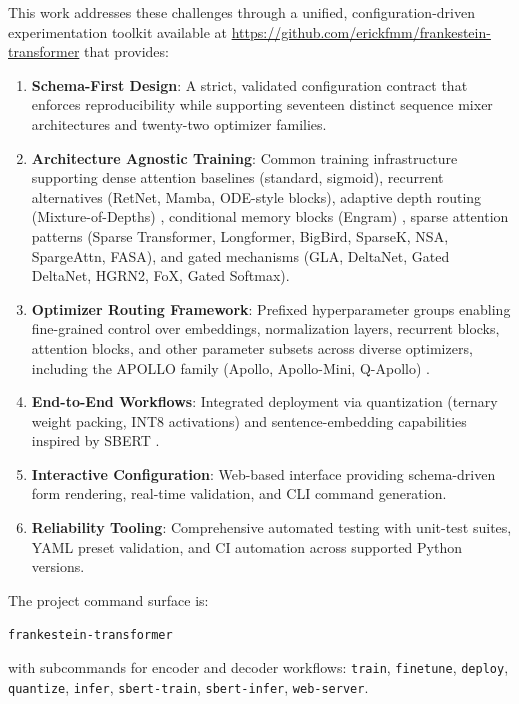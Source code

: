 \documentclass[11pt,a4paper]{article}
\begin{document}
This work addresses these challenges through a unified, configuration-driven experimentation toolkit available at \url{https://github.com/erickfmm/frankestein-transformer} that provides:
\begin{enumerate}[leftmargin=*]
    \item \textbf{Schema-First Design}: A strict, validated configuration contract that enforces reproducibility while supporting seventeen distinct sequence mixer architectures and twenty-two optimizer families.
    \item \textbf{Architecture Agnostic Training}: Common training infrastructure supporting dense attention baselines (standard, sigmoid), recurrent alternatives (RetNet, Mamba, ODE-style blocks), adaptive depth routing (Mixture-of-Depths) \citep{zhu2026mixtureofdepthsattention}, conditional memory blocks (Engram) \citep{cheng2026conditionalmemoryscalablelookup}, sparse attention patterns (Sparse Transformer, Longformer, BigBird, SparseK, NSA, SpargeAttn, FASA), and gated mechanisms (GLA, DeltaNet, Gated DeltaNet, HGRN2, FoX, Gated Softmax).
    \item \textbf{Optimizer Routing Framework}: Prefixed hyperparameter groups enabling fine-grained control over embeddings, normalization layers, recurrent blocks, attention blocks, and other parameter subsets across diverse optimizers, including the APOLLO family (Apollo, Apollo-Mini, Q-Apollo) \citep{zhu2025apollosgdlikememoryadamwlevel}.
    \item \textbf{End-to-End Workflows}: Integrated deployment via quantization (ternary weight packing, INT8 activations) and sentence-embedding capabilities inspired by SBERT \citep{reimers_sentence-bert_2019}.
    \item \textbf{Interactive Configuration}: Web-based interface providing schema-driven form rendering, real-time validation, and CLI command generation.
    \item \textbf{Reliability Tooling}: Comprehensive automated testing with unit-test suites, YAML preset validation, and CI automation across supported Python versions.
\end{enumerate}

The project command surface is:
\begin{center}
\texttt{frankestein-transformer}
\end{center}
with subcommands for encoder and decoder workflows:
\texttt{train}, \texttt{finetune}, \texttt{deploy}, \texttt{quantize}, \texttt{infer}, \texttt{sbert-train}, \texttt{sbert-infer}, \texttt{web-server}.
\end{document}
